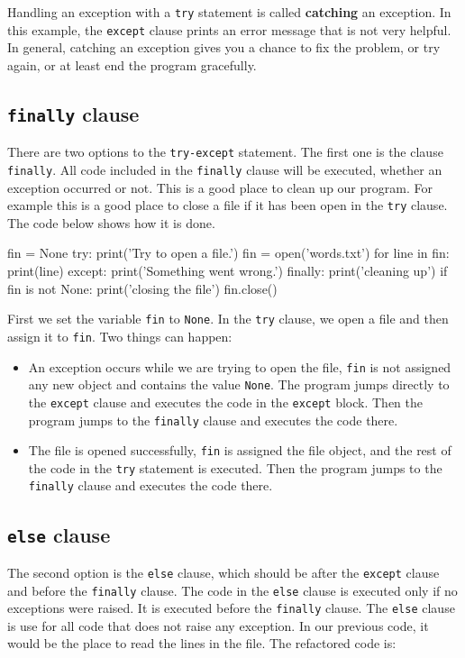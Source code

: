 Handling an exception with a {\tt try} statement is called {\bf
catching} an exception.  In this example, the {\tt except} clause
prints an error message that is not very helpful.  In general,
catching an exception gives you a chance to fix the problem, or try
again, or at least end the program gracefully.


\subsection{{\tt finally} clause}
There are two options to the \verb|try-except| statement.
The first one is the clause {\tt finally}. All code included in the 
{\tt finally} clause will be executed, whether an exception occurred 
or not. This is a good place to clean up our program. For example
this is a good place to close a file if it has been open in the {\tt try} 
clause. The code below shows how it is done.


\beforeverb
\begin{pycode}
fin = None
try:    
    print('Try to open a file.')
    fin = open('words.txt')
    for line in fin:
        print(line)
except:
    print('Something went wrong.')
finally:
    print('cleaning up')
    if fin is not None:
        print('closing the file')
        fin.close()
\end{pycode}
\afterverb

First we set the variable {\tt fin} to {\tt None}. In the {\tt try} clause, we 
open a file and then assign it to {\tt fin}. Two things can happen:

\begin{itemize}
	\item An exception occurs while we
are trying to open the file, {\tt fin} is not assigned any new object and contains 
the value {\tt None}. The program jumps directly to the {\tt except} clause and
executes the code in the {\tt except} block. Then the program jumps to the {\tt finally} 
clause and executes the code there.

	\item The file is opened successfully, {\tt fin} is assigned the file object, and the rest
	of the code in the {\tt try} statement is executed. Then the program jumps to the {\tt finally}
	clause and executes the code there.

\end{itemize} 

\subsection{{\tt else} clause}
The second option is the {\tt else} clause, which should be after the {\tt except} clause and before the {\tt finally} clause. The code in the {\tt else} clause is executed only if no exceptions were raised. It is executed before the {\tt finally} clause. The {\tt else} clause is use for all code that does not raise any exception. In our previous code, it would be the place to read the lines in the file. The refactored code is:

